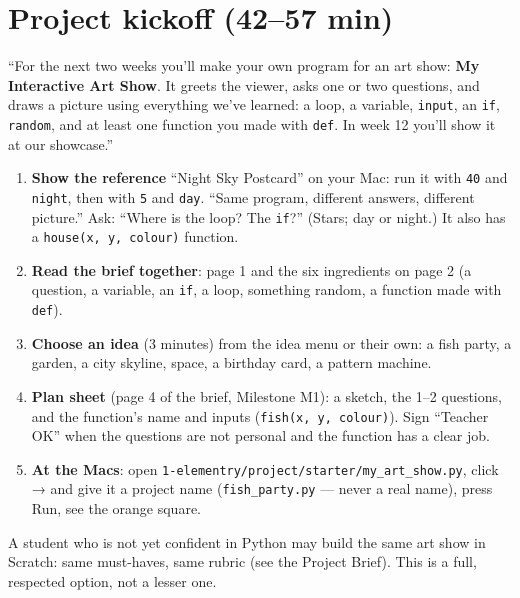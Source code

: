 \section{Project kickoff (42--57 min)}
\begin{teacherscript}
\enquote{For the next two weeks you'll make your own program for an art show: \textbf{My Interactive Art Show}. It greets the viewer, asks one or two questions, and draws a picture using everything we've learned: a loop, a variable, \texttt{input}, an \texttt{if}, \texttt{random}, and at least one function you made with \texttt{def}. In week 12 you'll show it at our showcase.}
\end{teacherscript}
\begin{enumerate}[leftmargin=1.4em,itemsep=2pt]
  \item \textbf{Show the reference} \enquote{Night Sky Postcard} on your Mac: run it with \texttt{40} and \texttt{night}, then with \texttt{5} and \texttt{day}. \enquote{Same program, different answers, different picture.} Ask: \enquote{Where is the loop? The \texttt{if}?} (Stars; day or night.) It also has a \texttt{house(x, y, colour)} function.
  \item \textbf{Read the brief together}: page 1 and the six ingredients on page 2 (a question, a variable, an \texttt{if}, a loop, something random, a function made with \texttt{def}).
  \item \textbf{Choose an idea} (3 minutes) from the idea menu or their own: a fish party, a garden, a city skyline, space, a birthday card, a pattern machine.
  \item \textbf{Plan sheet} (page 4 of the brief, Milestone M1): a sketch, the 1--2 questions, and the function's name and inputs (\texttt{fish(x, y, colour)}). Sign \enquote{Teacher OK} when the questions are not personal and the function has a clear job.
  \item \textbf{At the Macs}: open \texttt{1-elementry/project/starter/my\_art\_show.py}, click  →  and give it a project name (\texttt{fish\_party.py} --- never a real name), press Run, see the orange square.
\end{enumerate}
\begin{teachernote}
A student who is not yet confident in Python may build the same art show in Scratch: same must-haves, same rubric (see the Project Brief). This is a full, respected option, not a lesser one.
\end{teachernote}

